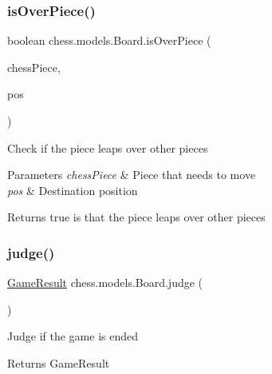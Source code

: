 \subsubsection{\texorpdfstring{is\+Over\+Piece()}{isOverPiece()}}
{\footnotesize\ttfamily boolean chess.\+models.\+Board.\+is\+Over\+Piece (\begin{DoxyParamCaption}\item[{\mbox{\hyperlink{classchess_1_1models_1_1_chess_piece}{Chess\+Piece}}}]{chess\+Piece,  }\item[{\mbox{\hyperlink{classchess_1_1models_1_1_position}{Position}}}]{pos }\end{DoxyParamCaption})}

Check if the piece leaps over other pieces


\begin{DoxyParams}{Parameters}
{\em chess\+Piece} & Piece that needs to move \\
\hline
{\em pos} & Destination position \\
\hline
\end{DoxyParams}
\begin{DoxyReturn}{Returns}
true is that the piece leaps over other pieces 
\end{DoxyReturn}
\mbox{\label{classchess_1_1models_1_1_board_a7e3f69e82d8337f3cf6109913e5335d3}} 
\subsubsection{\texorpdfstring{judge()}{judge()}}
{\footnotesize\ttfamily \mbox{\hyperlink{enumchess_1_1models_1_1enums_1_1_game_result}{Game\+Result}} chess.\+models.\+Board.\+judge (\begin{DoxyParamCaption}{ }\end{DoxyParamCaption})}

Judge if the game is ended

\begin{DoxyReturn}{Returns}
Game\+Result 
\end{DoxyReturn}
\mbox{\label{classchess_1_1models_1_1_board_a1ec14777a87bc322201a01609e4d6d2f}} 
